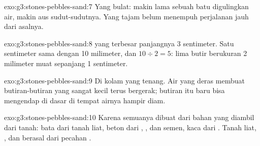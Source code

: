 \begin{solution}{exo:g3:stones-pebbles-sand:7}
Yang bulat: makin lama sebuah batu digulingkan air, makin aus
sudut-sudutnya. Yang tajam belum menempuh perjalanan jauh dari 
asalnya.
\end{solution}

\begin{solution}{exo:g3:stones-pebbles-sand:8}
 yang terbesar panjangnya 3 sentimeter. Satu sentimeter sama dengan
10 milimeter, dan $10 \div 2 = 5$: lima butir berukuran 2 milimeter muat
sepanjang 1 sentimeter.
\end{solution}

\begin{solution}{exo:g3:stones-pebbles-sand:9}
Di kolam yang tenang. Air yang deras membuat butiran-butiran  yang
sangat kecil terus bergerak; butiran itu baru bisa mengendap di dasar di
tempat airnya hampir diam.
\end{solution}

\begin{solution}{exo:g3:stones-pebbles-sand:10}
Karena semuanya dibuat dari bahan yang diambil dari tanah: bata dari tanah
liat, beton dari , , dan semen, kaca dari . Tanah liat,
, dan  berasal dari pecahan .
\end{solution}
